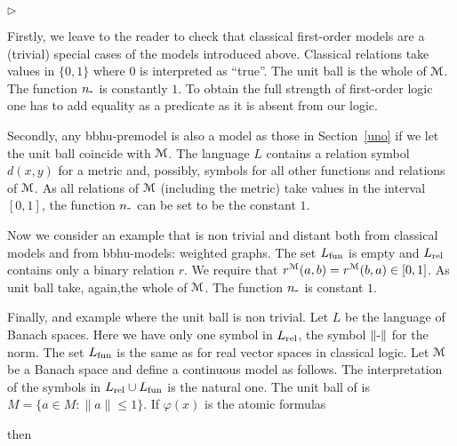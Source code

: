 \documentclass[12pt,letterpaper,oneside,reqno]{amsart}
\newcommand{\mylabel}[1]{{#1}\hfill}
\renewenvironment{itemize}
  {\begin{list}{$\triangleright$}{%
   \setlength{\parskip}{0mm}
   \setlength{\topsep}{.2\baselineskip}
   \setlength{\rightmargin}{0mm}
   \setlength{\listparindent}{0mm}
   \setlength{\itemindent}{0mm}
   \setlength{\labelwidth}{3ex}
   \setlength{\itemsep}{.2\baselineskip}
   \setlength{\parsep}{.2\baselineskip}
   \setlength{\partopsep}{0mm}
   \setlength{\labelsep}{1ex}
   \setlength{\leftmargin}{\labelwidth+\labelsep}
   \let\makelabel\mylabel}}{%
   \end{list}}
\theoremstyle{plain}
\theoremstyle{remark}
\begin{document}
\begin{itemize}
  \item [1.] Firstly, we leave to the reader to check that classical first-order models are a (trivial) special cases of the models introduced above.
        Classical relations take values in $\{0,1\}$ where $0$ is interpreted as ``true''.
        The unit ball is the whole of ${\EuScript M}$.
        The function $n_{\mbox-}$ is constantly $1$.
        To obtain the full strength of first-order logic one has to add equality as a predicate as it is absent from our logic.

  \item [2.] Secondly, any {\sc bbhu}-premodel is also a model as those in Section~\ref{uno} if we let the unit ball coincide with ${\EuScript M}$.
        The language $L$ contains a relation symbol $d(x,y)$ for a metric and, possibly, symbols for all other functions and relations of ${\EuScript M}$.
        As all relations of ${\EuScript M}$ (including the metric) take values in the interval $[0,1]$, the function $n_{\mbox-}$ can be set to be the constant $1$.

  \item [3.] Now we consider an example that is non trivial and distant both from classical models and from {\sc bbhu}-models: weighted graphs.
        The set $L_{\rm fun}$ is empty and $L_{\rm rel}$ contains only a binary relation $r$.
        We require that $r^{\EuScript M}(a,b)=r^{\EuScript M}(b,a)\in[0,1]$.
        As unit ball take, again,the whole of ${\EuScript M}$.
        The function $n_{\mbox-}$ is constant $1$.


  \item [4.] Finally, and example where the unit ball is non trivial.
        Let $L$ be the language of Banach spaces.
        Here we have only one symbol in $L_{\rm rel}$, the symbol $\|\mbox-\|$ for the norm.
        The set $L_{\rm fun}$ is the same as for real vector spaces in classical logic.
        Let ${\EuScript M}$ be a Banach space and define a continuous model as follows.
        The interpretation of the symbols in $L_{\rm rel}\cup L_{\rm fun}$ is the natural one.
        The unit ball of is $M=\{a\in M: \|a\|\le1\}$.
        If $\varphi(x)$ is the atomic formulas


        then



\end{itemize}
\end{document}
